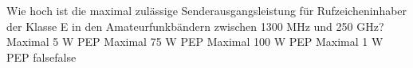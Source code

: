     {Wie hoch ist die maximal zulässige Senderausgangsleistung für Rufzeicheninhaber der
Klasse E in den Amateurfunkbändern zwischen 1300 MHz und 250 GHz?}
    {Maximal 5 W PEP }
    {Maximal 75 W PEP}
    {Maximal 100 W PEP}
    {Maximal 1 W PEP}
    {false}{false}
